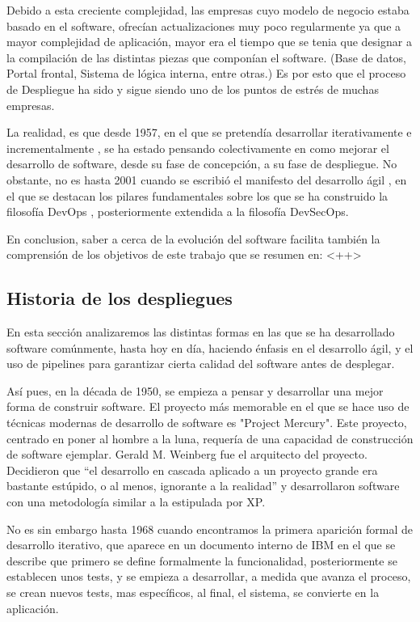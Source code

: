 \documentclass[12pt]{report} %
\begin{document}
Debido a esta creciente complejidad, las empresas cuyo modelo de negocio estaba basado en el software, ofrecían actualizaciones muy poco regularmente ya que a mayor complejidad de aplicación, mayor era el tiempo que se tenia que designar a la compilación de las distintas piezas que componían el software. (Base de datos, Portal frontal, Sistema de lógica interna, entre otras.)
Es por esto que el proceso de Despliegue ha sido y sigue siendo uno de los puntos de estrés de muchas empresas.

La realidad, es que desde 1957, en el que se pretendía desarrollar iterativamente e incrementalmente \cite{IID}, se ha estado pensando colectivamente en como mejorar el desarrollo de software, desde su fase de concepción, a su fase de despliegue.
No obstante, no es hasta 2001 cuando se escribió el manifesto del desarrollo ágil \cite{agile}, en el que se destacan los pilares fundamentales sobre los que se ha construido la filosofía DevOps \cite{CD-TF}, posteriormente extendida a la filosofía DevSecOps.

En conclusion, saber a cerca de la evolución del software facilita también la comprensión de los objetivos de este trabajo que se resumen en: <++> %


\subsection{Historia de los despliegues}

En esta sección analizaremos las distintas formas en las que se ha desarrollado software comúnmente, hasta hoy en día, haciendo énfasis en el desarrollo ágil, y el uso de \Gls{pipeline}s para garantizar cierta calidad del software antes de desplegar.

Así pues, en la década de 1950, se empieza a pensar y desarrollar una mejor forma de construir software.
El proyecto más memorable en el que se hace uso de técnicas modernas de desarrollo de software es "Project Mercury".
Este proyecto, centrado en poner al hombre a la luna, requería de una capacidad de construcción de software ejemplar.
Gerald M. Weinberg fue el arquitecto del proyecto.
Decidieron que ``el desarrollo en cascada aplicado a un proyecto grande era bastante estúpido, o al menos, ignorante a la realidad'' \cite{GW-PM} y desarrollaron software con una metodología similar a la estipulada por XP. \cite{XP}

No es sin embargo hasta 1968 cuando encontramos la primera aparición formal de desarrollo iterativo, que aparece en un documento interno de IBM en el que se describe que primero se define formalmente la funcionalidad, posteriormente se establecen unos tests, y se empieza a desarrollar, a medida que avanza el proceso, se crean nuevos tests, mas específicos, al final, el sistema, se convierte en la aplicación. \cite{ID-FB}
\end{document}
